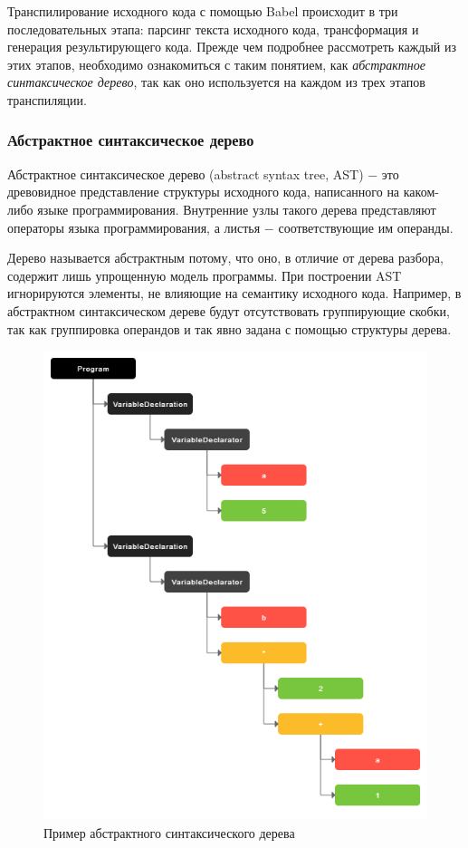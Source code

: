 \documentclass[14pt, a4paper]{article}
\begin{document}
Транспилирование исходного кода с помощью Babel происходит в три последовательных этапа: парсинг текста 
исходного кода, трансформация и генерация результирующего кода. Прежде чем подробнее рассмотреть каждый из 
этих этапов, необходимо ознакомиться с таким понятием, как \textit{абстрактное синтаксическое дерево}, 
так как оно используется на каждом из трех этапов транспиляции.

\subsubsection{Абстрактное синтаксическое дерево}

Абстрактное синтаксическое дерево (abstract syntax tree, AST) $-$ это древовидное представление структуры исходного кода, написанного
на каком-либо языке программирования. Внутренние узлы такого дерева представляют операторы языка 
программирования, а листья $-$ соответствующие им операнды.  

Дерево называется абстрактным потому, что оно, в отличие от дерева разбора, содержит лишь упрощенную модель программы. При построении
AST игнорируются элементы, не влияющие на семантику исходного кода. Например, в абстрактном синтаксическом
дереве будут отсутствовать группирующие скобки, так как группировка операндов и так явно задана с помощью структуры дерева.

\begin{figure}[H]
  \centering
  \includegraphics[scale=0.6]{img/ast.png}
  \caption{Пример абстрактного синтаксического дерева}
  \label{ast}
\end{figure}
\end{document}

